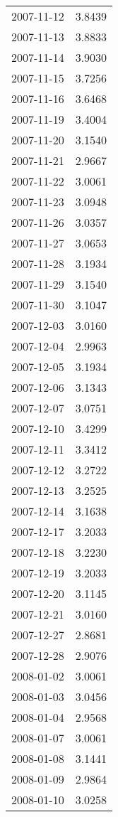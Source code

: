 \begin{tabular}{lr}
2007-11-12 &      3.8439 \\
2007-11-13 &      3.8833 \\
2007-11-14 &      3.9030 \\
2007-11-15 &      3.7256 \\
2007-11-16 &      3.6468 \\
2007-11-19 &      3.4004 \\
2007-11-20 &      3.1540 \\
2007-11-21 &      2.9667 \\
2007-11-22 &      3.0061 \\
2007-11-23 &      3.0948 \\
2007-11-26 &      3.0357 \\
2007-11-27 &      3.0653 \\
2007-11-28 &      3.1934 \\
2007-11-29 &      3.1540 \\
2007-11-30 &      3.1047 \\
2007-12-03 &      3.0160 \\
2007-12-04 &      2.9963 \\
2007-12-05 &      3.1934 \\
2007-12-06 &      3.1343 \\
2007-12-07 &      3.0751 \\
2007-12-10 &      3.4299 \\
2007-12-11 &      3.3412 \\
2007-12-12 &      3.2722 \\
2007-12-13 &      3.2525 \\
2007-12-14 &      3.1638 \\
2007-12-17 &      3.2033 \\
2007-12-18 &      3.2230 \\
2007-12-19 &      3.2033 \\
2007-12-20 &      3.1145 \\
2007-12-21 &      3.0160 \\
2007-12-27 &      2.8681 \\
2007-12-28 &      2.9076 \\
2008-01-02 &      3.0061 \\
2008-01-03 &      3.0456 \\
2008-01-04 &      2.9568 \\
2008-01-07 &      3.0061 \\
2008-01-08 &      3.1441 \\
2008-01-09 &      2.9864 \\
2008-01-10 &      3.0258 \\

\end{tabular}
